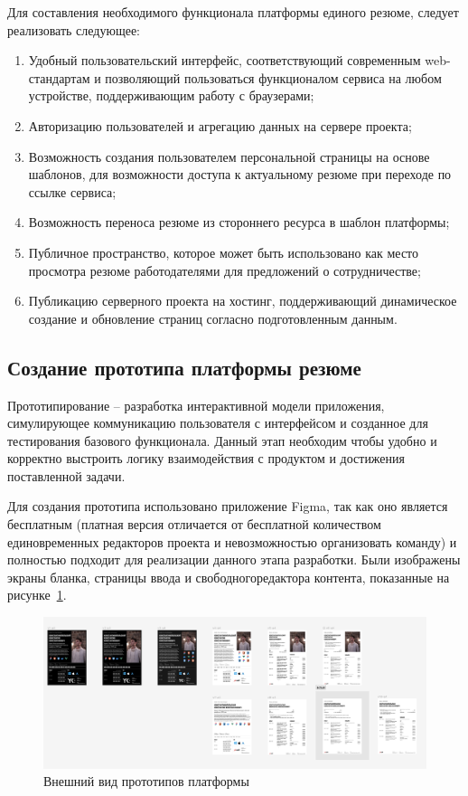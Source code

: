 \documentclass[master, och, diploma]{SCWorks}
\begin{document}
Для составления необходимого функционала платформы единого резюме, следует реализовать следующее:
\begin{enumerate}
    \item Удобный пользовательский интерфейс, соответствующий современным web-стандартам 
    и позволяющий пользоваться функционалом сервиса на любом устройстве, поддерживающим 
    работу с браузерами;
    \item Авторизацию пользователей и агрегацию данных на сервере проекта;
    \item Возможность создания пользователем персональной страницы на основе шаблонов, 
    для возможности доступа к актуальному резюме при переходе по ссылке сервиса;
    \item Возможность переноса резюме из стороннего ресурса в шаблон платформы;
    \item Публичное пространство, которое может быть использовано как место просмотра 
    резюме работодателями для предложений о сотрудничестве;
    \item Публикацию серверного проекта на хостинг, поддерживающий динамическое 
    создание и обновление страниц согласно подготовленным данным.
\end{enumerate}



\subsection{Создание прототипа платформы резюме}
Прототипирование – разработка интерактивной модели приложения, симулирующее коммуникацию пользователя с интерфейсом и созданное для тестирования базового функционала. Данный этап необходим чтобы удобно и корректно выстроить логику взаимодействия с продуктом и достижения поставленной задачи.

Для создания прототипа использовано приложение Figma, так как оно является бесплатным (платная версия отличается от бесплатной количеством единовременных редакторов проекта и невозможностью организовать команду) и полностью подходит для реализации данного этапа разработки. Были изображены экраны бланка, страницы ввода и свободногоредактора контента, показанные на рисунке~\ref{fig:20}.

\begin{figure}[!ht]
    \centering
    \includegraphics[width=12cm]{images/image21.png}
    \caption{\label{fig:20}%
        Внешний вид прототипов платформы}
\end{figure}
\end{document}
